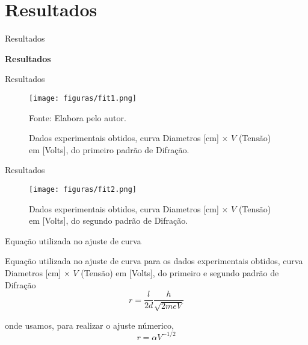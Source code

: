 \section{Resultados}

\begin{frame}{Resultados}
    \Huge{\centerline{\textbf{Resultados}}}
\end{frame}


\begin{frame}{Resultados}

        \begin{center}
        \begin{figure}
        \caption{Dados experimentais obtidos, curva Diametros [cm] $\times$ $V$ (Tensão) em [Volts], do primeiro padrão de Difração.}
        \vspace*{-0.25cm}
        \texttt{[image: figuras/fit1.png]}\par
        {\scriptsize Fonte: Elabora pelo autor.}
        \end{figure}
        \end{center}
    
\end{frame}

\begin{frame}{Resultados}

        \begin{center}
        \begin{figure}
        \caption{Dados experimentais obtidos, curva Diametros [cm] $\times$ $V$ (Tensão) em [Volts], do segundo padrão de Difração.}
        \vspace*{-0.25cm}
        \texttt{[image: figuras/fit2.png]}\par
        \end{figure}
        \end{center}
    
\end{frame}

\begin{frame}{Equação utilizada no ajuste de curva}
    
    Equação utilizada no ajuste de curva para os dados experimentais obtidos, curva Diametros [cm] $\times$ $V$ (Tensão) em [Volts], do primeiro e segundo padrão de Difração
    \begin{equation}
    r = \frac{l}{2d} \frac{h}{\sqrt{2 m e V}}
    \end{equation}

    onde usamos, para realizar o ajuste númerico,
    \begin{equation}
    r = \alpha V^{-1/2}
    \end{equation}

\end{frame}

